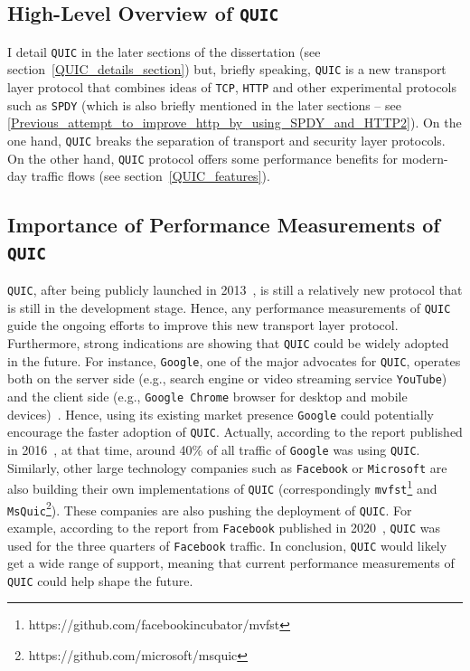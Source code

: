 \documentclass[12pt,a4paper]{report}
\begin{document}
 

\subsection{High-Level Overview of \texttt{QUIC}}
I detail \texttt{QUIC} in the later sections of the dissertation (see section~\ref{QUIC_details_section}) but, briefly speaking, \texttt{QUIC} is a new transport layer protocol that combines ideas of \texttt{TCP}, \texttt{HTTP} and other experimental protocols such as \texttt{SPDY} (which is also briefly mentioned in the later sections -- see \ref{Previous_attempt_to_improve_http_by_using_SPDY_and_HTTP2}).
On the one hand, \texttt{QUIC} breaks the separation of transport and security layer protocols. 
On the other hand, \texttt{QUIC} protocol offers some performance benefits for modern-day traffic flows (see section~\ref{QUIC_features}).


\subsection{Importance of Performance Measurements of \texttt{QUIC}}

\texttt{QUIC}, after being publicly launched in 2013~\cite{Chromium_Blog_Experimenting_with_quic},  is still a relatively new protocol that is still in the development stage.
Hence, any performance measurements of \texttt{QUIC} guide the ongoing efforts to improve this new transport layer protocol.
Furthermore, strong indications are showing that \texttt{QUIC} could be widely adopted in the future.
For instance, \texttt{Google}, one of the major advocates for \texttt{QUIC}, operates both on the server side (e.g., search engine or video streaming service \texttt{YouTube}) and the client side (e.g., \texttt{Google Chrome} browser for desktop and mobile devices)~\cite{A_QUICk_Introduction_to_HTTP3}.
Hence, using its existing market presence \texttt{Google} could potentially encourage the faster adoption of \texttt{QUIC}.
Actually, according to the report published in 2016~\cite{RuthJan2018AFLa}, at that time, around 40\% of all traffic of \texttt{Google} was using \texttt{QUIC}.
Similarly, other large technology companies such as \texttt{Facebook} or \texttt{Microsoft} are also building their own implementations of \texttt{QUIC} (correspondingly \texttt{mvfst}\footnote{https://github.com/facebookincubator/mvfst} and \texttt{MsQuic}\footnote{https://github.com/microsoft/msquic}).
These companies are also pushing the deployment of \texttt{QUIC}. 
For example, according to the report from \texttt{Facebook} published in 2020~\cite{how-facebook-is-bringing-quic-to-billions}, \texttt{QUIC} was used for the three quarters of \texttt{Facebook} traffic. 
In conclusion, \texttt{QUIC} would likely get a wide range of support, meaning that current performance measurements of \texttt{QUIC} could help shape the future.
\end{document}
